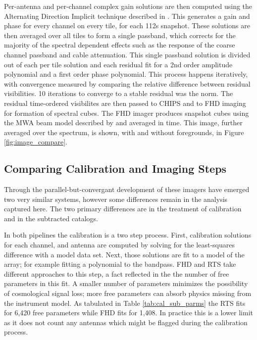 \documentclass[twolcolumn,iop]{emulateapj}
\begin{document}
 Per-antenna and per-channel complex gain solutions are then computed using the Alternating Direction Implicit technique described in \citet{sal14}.  This generates a gain and phase for every channel on every tile, for each 112s snapshot.  These solutions are then averaged over all tiles to form a single passband, which corrects for the majority of the spectral dependent effects such as the response of the coarse channel passband and cable attenuation.  This single passband solution is divided out of each per tile solution and each residual fit for a 2nd order amplitude polynomial and a first order phase polynomial. This process happens iteratively, with convergence measured by comparing the relative difference between residual visibilities. 10 iterations to converge to a stable residual was the norm.  The residual time-ordered visibilites are then passed to CHIPS and to FHD imaging for formation of spectral cubes.  The FHD imager  produces snapshot cubes using the MWA beam model described by \cite{Sutinjo:2015RaSc...50...52S} and averaged in time. This image, further averaged over the spectrum, is shown, with and without foregrounds, in Figure \ref{fig:image_compare}.

\subsection{Comparing Calibration and Imaging Steps}
\label{sec:comparing_imaging}
Through the parallel-but-convergant development of these imagers have emerged two very similar systems, however some differences remain in the analysis captured here. The two primary differences are in the treatment of calibration and in the subtracted catalogs.  

In both pipelines the calibration is a two step process. First, calibration solutions for each channel, and antenna are computed by solving for the least-squares difference with a model data set. Next, those solutions are fit to a model of the array; for example fitting a polynomial to the bandpass. FHD and RTS take different approaches to this step, a fact reflected in the the number of free parameters in this fit. A smaller number of parameters minimizes the possibility of cosmological signal loss; more free parameters can absorb physics missing from the instrument model.  As tabulated in Table \ref{tab:cal_sub_parms} the RTS fits for 6,420 free parameters while FHD fits for 1,408.  In practice this is a lower limit as it does not count any antennas which might be flagged during the calibration process. 
\end{document}
